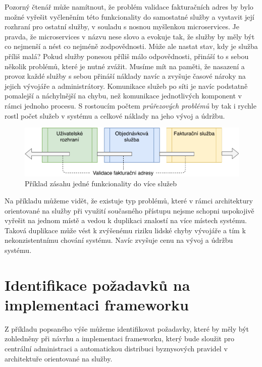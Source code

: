 Pozorný čtenář může namítnout, že problém validace fakturačních adres by
bylo možné vyřešit vyčleněním této funkcionality
do samostatné služby a vystavit její rozhraní pro ostatní služby,
v souladu s nosnou myšlenkou microservices. Je pravda, že microservices
v názvu nese slovo  a evokuje tak, že služby by měly být co nejmenší
a nést co nejméně zodpovědnosti. Může ale nastat stav, kdy je služba příliš malá?
Pokud služby ponesou příliš málo odpovědnosti,
přináší to s sebou několik problémů, které je nutné zvážit. Musíme mít na paměti, že
nasazení a provoz každé služby s sebou přináší náklady navíc
a zvyšuje časové nároky na jejich vývojáře a administrátory.
Komunikace služeb po síti je navíc podstatně pomalejší a náchylnější na
chybu, než komunikace jednotlivých komponent v rámci jednoho procesu.
S rostoucím počtem \textit{průřezových problémů} by tak i rychle rostl
počet služeb v systému a celkové náklady na jeho vývoj a údržbu.

\begin{figure}
    \centering
    \includegraphics[keepaspectratio=true, width=0.8\linewidth]{figures/service-cutting.pdf}
    \caption{Příklad zásahu jedné funkcionality do více služeb}
    \label{fig:service-cutting}
\end{figure}

Na příkladu můžeme vidět, že existuje typ problémů, které v rámci architektury
orientované na služby při využití současného přístupu nejsme schopni uspokojivě
vyřešit na jednom místě a vedou k duplikaci znalostí na více místech systému.
Taková duplikace může vést k zvýšenému riziku lidské chyby vývojáře a tím k
nekonzistentnímu chování systému. Navíc zvyšuje cenu na vývoj a údržbu systému.

\section{Identifikace požadavků na implementaci frameworku}

Z příkladu popsaného výše můžeme identifikovat požadavky, které by měly
být zohledněny při návrhu a implementaci frameworku, který bude sloužit
pro centrální administraci a automatickou distribuci byznysových pravidel
v architektuře orientované na služby.

